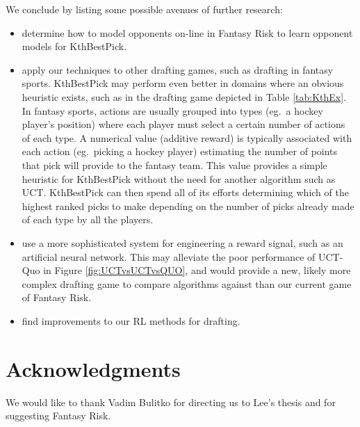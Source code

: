 \documentclass[letterpaper]{article}
\numberwithin{equation}{section}
\numberwithin{theorem}{section}
\numberwithin{lemma}{section}
\numberwithin{df}{section}
\begin{document}
We conclude by listing some possible avenues of further research:
\begin{itemize}
	\item determine how to model opponents on-line in Fantasy Risk to learn opponent models for KthBestPick.
	\item apply our techniques to other drafting games, such as drafting in fantasy sports.  KthBestPick may perform even better in domains where an obvious heuristic exists, such as in the drafting game depicted in Table \ref{tab:KthEx}.  In fantasy sports, actions are usually grouped into types (eg.~a hockey player's position) where each player must select a certain number of actions of each type.  A numerical value (additive reward) is typically associated with each action (eg.~picking a hockey player) estimating the number of points that pick will provide to the fantasy team.  This value provides a simple heuristic for KthBestPick without the need for another algorithm such as UCT.  KthBestPick can then spend all of its efforts determining which of the highest ranked picks to make depending on the number of picks already made of each type by all the players.
	\item use a more sophisticated system for engineering a reward signal, such as an artificial neural network.  This may alleviate the poor performance of UCT-Quo in Figure \ref{fig:UCTvsUCTvsQUO}, and would provide a new, likely more complex drafting game to compare algorithms against than our current game of Fantasy Risk.
	\item find improvements to our RL methods for drafting.
\end{itemize}

\section*{Acknowledgments}
We would like to thank Vadim Bulitko for directing us to Lee's thesis and for suggesting Fantasy Risk.  %

%
%


\end{document}
